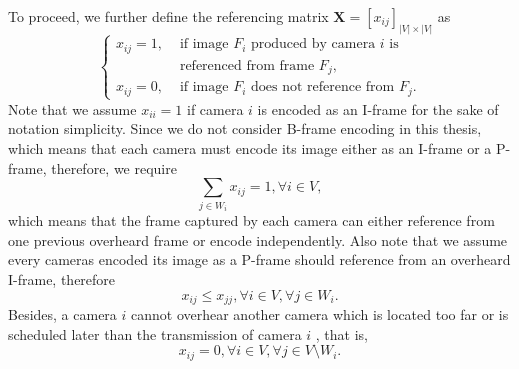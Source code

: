 To proceed, we further 
define the referencing matrix ${\mathbf{X} = [x_{ij}]_{|V| \times |V|}}$ as
\begin{equation*}
\left\{ \begin{array}{ll}
x_{ij} = 1, &\text{ if image $F_i$ produced by camera $i$ is} \\
                   &\text{ referenced from frame $F_j$,} \\
x_{ij} = 0, &\text{ if image $F_i$ does not reference from $F_j$.}
\end{array} \right.
\end{equation*}
Note that we assume $x_{ii}=1$ if camera $i$ is encoded as an I-frame for the sake of notation simplicity.
Since we do not consider B-frame encoding in this thesis, which means that each camera must encode its image either as an I-frame or a P-frame, therefore, we require
\begin{equation}
\sum_{j \in W_i} x_{ij} = 1, \forall i \in V,
\label{eq::referenceConstraint}
\end{equation}
which means that the frame captured by each camera can either reference from one previous overheard frame or encode independently.
Also note that we assume every cameras encoded its image as a P-frame should reference from an overheard I-frame, therefore
\begin{equation}
x_{ij} \leq x_{jj}, \forall i \in V, \forall j \in W_i.
\label{eq::referenceOnlyIframe}
\end{equation}
Besides, a camera $i$ cannot overhear another camera which is located too far or is scheduled later than the transmission of camera $i$ , that is,
\begin{equation}
x_{ij} = 0, \forall i \in V, \forall j \in V \setminus W_i.
\label{eq::xConstraintForNonoverheard}
\end{equation}
%
%
